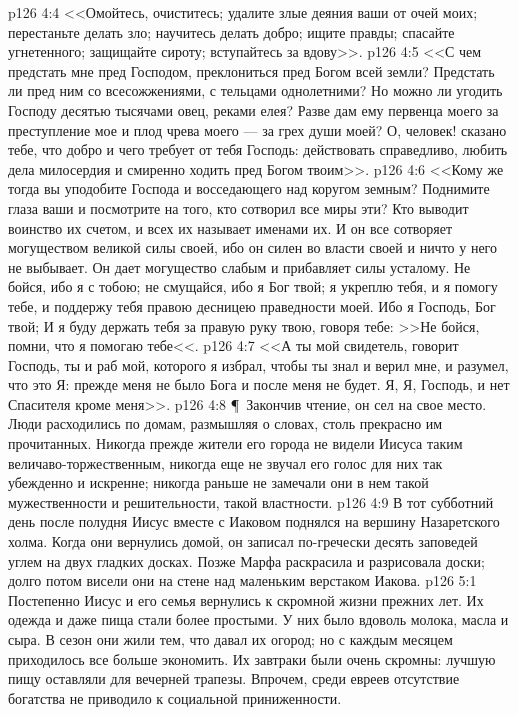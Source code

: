 \vs p126 4:4 <<Омойтесь, очиститесь; удалите злые деяния ваши от очей моих; перестаньте делать зло; научитесь делать добро; ищите правды; спасайте угнетенного; защищайте сироту; вступайтесь за вдову>>.
\vs p126 4:5 <<С чем предстать мне пред Господом, преклониться пред Богом всей земли? Предстать ли пред ним со всесожжениями, с тельцами однолетними? Но можно ли угодить Господу десятью тысячами овец, реками елея? Разве дам ему первенца моего за преступление мое и плод чрева моего --- за грех души моей? О, человек! сказано тебе, что добро и чего требует от тебя Господь: действовать справедливо, любить дела милосердия и смиренно ходить пред Богом твоим>>.
\vs p126 4:6 <<Кому же тогда вы уподобите Господа и восседающего над коругом земным? Поднимите глаза ваши и посмотрите на того, кто сотворил все миры эти? Кто выводит воинство их счетом, и всех их называет именами их. И он все сотворяет могуществом великой силы своей, ибо он силен во власти своей и ничто у него не выбывает. Он дает могущество слабым и прибавляет силы усталому. Не бойся, ибо я с тобою; не смущайся, ибо я Бог твой; я укреплю тебя, и я помогу тебе, и поддержу тебя правою десницею праведности моей. Ибо я Господь, Бог твой; И я буду держать тебя за правую руку твою, говоря тебе: >>Не бойся, помни, что я помогаю тебе<<.
\vs p126 4:7 <<А ты мой свидетель, говорит Господь, ты и раб мой, которого я избрал, чтобы ты знал и верил мне, и разумел, что это Я: прежде меня не было Бога и после меня не будет. Я, Я, Господь, и нет Спасителя кроме меня>>.
\vs p126 4:8 \P\ Закончив чтение, он сел на свое место. Люди расходились по домам, размышляя о словах, столь прекрасно им прочитанных. Никогда прежде жители его города не видели Иисуса таким величаво\hyp{}торжественным, никогда еще не звучал его голос для них так убежденно и искренне; никогда раньше не замечали они в нем такой мужественности и решительности, такой властности.
\vs p126 4:9 В тот субботний день после полудня Иисус вместе с Иаковом поднялся на вершину Назаретского холма. Когда они вернулись домой, он записал по\hyp{}гречески десять заповедей углем на двух гладких досках. Позже Марфа раскрасила и разрисовала доски; долго потом висели они на стене над маленьким верстаком Иакова.
\vs p126 5:1 Постепенно Иисус и его семья вернулись к скромной жизни прежних лет. Их одежда и даже пища стали более простыми. У них было вдоволь молока, масла и сыра. В сезон они жили тем, что давал их огород; но с каждым месяцем приходилось все больше экономить. Их завтраки были очень скромны: лучшую пищу оставляли для вечерней трапезы. Впрочем, среди евреев отсутствие богатства не приводило к социальной приниженности.
